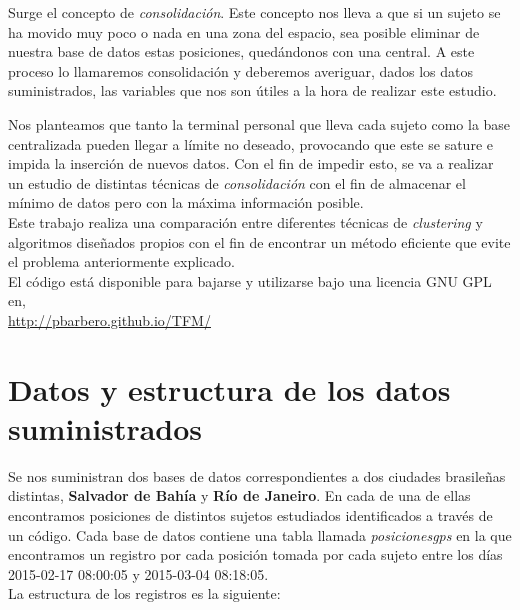 \documentclass[a4paper, 12pt]{article}
\begin{document}
Surge el concepto de \textit{consolidaci\'on}. Este concepto nos lleva a que si un sujeto se ha movido muy poco o nada en una zona del espacio, sea posible eliminar de nuestra base de datos estas posiciones, qued\'andonos con una central. A este proceso lo llamaremos consolidaci\'on y deberemos averiguar, dados los datos suministrados, las variables que nos son \'utiles a la hora de realizar este estudio.

Nos planteamos que tanto la terminal personal que lleva cada sujeto como la base centralizada pueden llegar a l\'imite no deseado, provocando que este se sature e impida la inserci\'on de nuevos datos. Con el fin de impedir esto, se va a realizar un estudio de distintas t\'ecnicas de \textit{consolidaci\'on} con el fin de almacenar el m\'inimo de datos pero con la m\'axima informaci\'on posible. \\

Este trabajo realiza una comparaci\'on entre diferentes t\'ecnicas de \textit{clustering} y algoritmos dise\~nados propios con el fin de encontrar un m\'etodo eficiente que evite el problema anteriormente explicado. \\

El c\'odigo est\'a disponible para bajarse y utilizarse bajo una licencia GNU GPL en,\\

\href{http://pbarbero.github.io/TFM/}{http://pbarbero.github.io/TFM/}


\pagebreak

\section{Datos y estructura de los datos suministrados}

Se nos suministran dos bases de datos correspondientes a dos ciudades brasile\~nas distintas, \textbf{Salvador de Bah\'ia} y \textbf{R\'io de Janeiro}. En cada de una de ellas encontramos posiciones de distintos sujetos estudiados identificados a trav\'es de un c\'odigo. Cada base de datos contiene una tabla llamada \textit{posicionesgps} en la que encontramos un registro por cada posici\'on tomada por cada sujeto entre los d\'ias 2015-02-17 08:00:05 y 2015-03-04 08:18:05. \\

La estructura de los registros es la siguiente:
\end{document}
